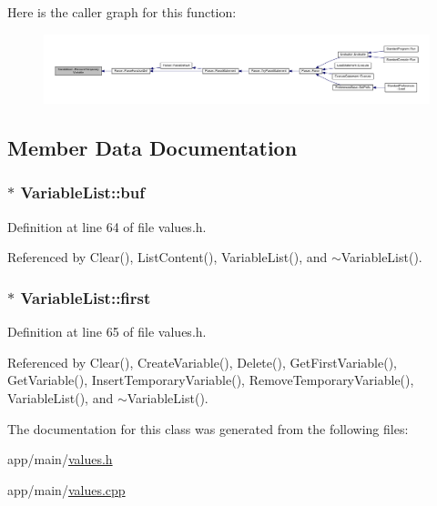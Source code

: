 Here is the caller graph for this function\+:\nopagebreak
\begin{figure}[H]
\begin{center}
\leavevmode
\includegraphics[width=350pt]{classVariableList_a489608dbcd6989a9ffd4092234a8052c_icgraph}
\end{center}
\end{figure}




\subsection{Member Data Documentation}
\subsubsection[{\texorpdfstring{buf}{buf}}]{$\ast$ Variable\+List\+::buf\hspace{0.3cm}{\ttfamily [private]}}\hypertarget{classVariableList_a11bf03542fab82869135f3f300890376}{}\label{classVariableList_a11bf03542fab82869135f3f300890376}


Definition at line 64 of file values.\+h.



Referenced by Clear(), List\+Content(), Variable\+List(), and $\sim$\+Variable\+List().

\subsubsection[{\texorpdfstring{first}{first}}]{$\ast$ Variable\+List\+::first\hspace{0.3cm}{\ttfamily [private]}}\hypertarget{classVariableList_a353a26f311a6d98716485f50c6907f7e}{}\label{classVariableList_a353a26f311a6d98716485f50c6907f7e}


Definition at line 65 of file values.\+h.



Referenced by Clear(), Create\+Variable(), Delete(), Get\+First\+Variable(), Get\+Variable(), Insert\+Temporary\+Variable(), Remove\+Temporary\+Variable(), Variable\+List(), and $\sim$\+Variable\+List().



The documentation for this class was generated from the following files\+:\begin{DoxyCompactItemize}
\item 
app/main/\hyperlink{values_8h}{values.\+h}\item 
app/main/\hyperlink{values_8cpp}{values.\+cpp}\end{DoxyCompactItemize}
